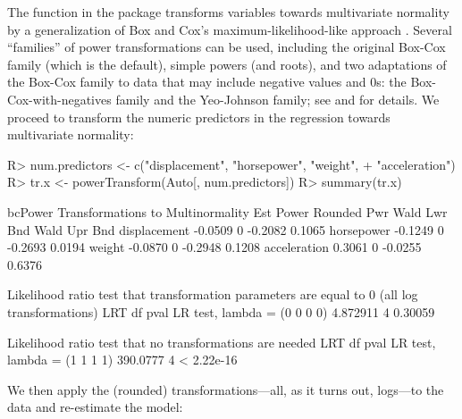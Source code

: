 \documentclass[
]{jss}
\begin{document}
The  function in the  package transforms
variables towards multivariate normality by a generalization of Box and
Cox's maximum-likelihood-like approach \citep{BoxCox:1964}. Several
``families'' of power transformations can be used, including the
original Box-Cox family (which is the default), simple powers (and
roots), and two adaptations of the Box-Cox family to data that may
include negative values and 0s: the Box-Cox-with-negatives family and
the Yeo-Johnson family; see \citet[Chap. 8]{Weisberg:2014} and
\citet[Chap. 3]{FoxWeisberg:2019} for details. We proceed to transform
the numeric predictors in the  regression towards
multivariate normality:

\begin{CodeChunk}
\begin{CodeInput}
R> num.predictors <- c("displacement", "horsepower", "weight", 
+                     "acceleration")
R> tr.x <- powerTransform(Auto[, num.predictors])
R> summary(tr.x)
\end{CodeInput}
\begin{CodeOutput}
bcPower Transformations to Multinormality 
             Est Power Rounded Pwr Wald Lwr Bnd Wald Upr Bnd
displacement   -0.0509           0      -0.2082       0.1065
horsepower     -0.1249           0      -0.2693       0.0194
weight         -0.0870           0      -0.2948       0.1208
acceleration    0.3061           0      -0.0255       0.6376

Likelihood ratio test that transformation parameters are equal to 0
 (all log transformations)
                                 LRT df    pval
LR test, lambda = (0 0 0 0) 4.872911  4 0.30059

Likelihood ratio test that no transformations are needed
                                 LRT df       pval
LR test, lambda = (1 1 1 1) 390.0777  4 < 2.22e-16
\end{CodeOutput}
\end{CodeChunk}

We then apply the (rounded) transformations---all, as it turns out,
logs---to the data and re-estimate the model:

\begin{CodeChunk}
\end{CodeChunk}
\end{document}
